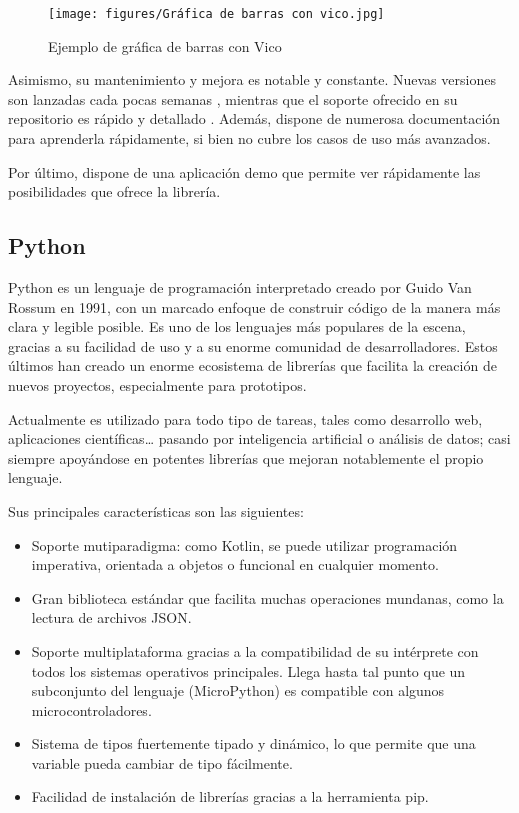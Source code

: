             \begin{figure}[h]
                \centering
                \texttt{[image: figures/Gráfica de barras con vico.jpg]}
                \caption{Ejemplo de gráfica de barras con Vico}
                \label{figure:vico:ejemplo_barras}
            \end{figure}
            
            Asimismo, su mantenimiento y mejora es notable y constante. Nuevas versiones son lanzadas
            cada pocas semanas \cite{goworowski_vico_2023-1}, mientras que el soporte ofrecido en su repositorio 
            es rápido y detallado \cite{goworowski_vico_2023}. Además, dispone de numerosa documentación para
            aprenderla rápidamente, si bien no cubre los casos de uso más avanzados.

            Por último, dispone de una aplicación demo que permite ver rápidamente las posibilidades que ofrece la 
            librería.
    
        \subsection{Python}
            Python es un lenguaje de programación interpretado creado por Guido Van Rossum en 1991, con un marcado enfoque 
            de construir código de la manera más clara y legible posible. Es uno de los lenguajes más populares de la 
            escena, gracias a su facilidad de uso y a su enorme comunidad de desarrolladores. Estos últimos han creado un 
            enorme ecosistema de librerías que facilita la creación de nuevos proyectos, especialmente para prototipos.

            Actualmente es utilizado para todo tipo de tareas, tales como desarrollo web, aplicaciones científicas… 
            pasando por inteligencia artificial o análisis de datos; casi siempre apoyándose en potentes librerías 
            que mejoran notablemente el propio lenguaje. 

            Sus principales características son las siguientes:
            \begin{itemize}
                \item Soporte mutiparadigma: como Kotlin, se puede utilizar programación imperativa, orientada a objetos o 
                funcional en cualquier momento.
                \item Gran biblioteca estándar que facilita muchas operaciones mundanas, como la lectura de archivos JSON.
                \item Soporte multiplataforma gracias a la compatibilidad de su intérprete con todos los sistemas 
                operativos principales. Llega hasta tal punto que un subconjunto del lenguaje (MicroPython) es compatible 
                con algunos microcontroladores.
                \item Sistema de tipos fuertemente tipado y dinámico, lo que permite que una variable pueda cambiar de 
                tipo fácilmente.
                \item Facilidad de instalación de librerías gracias a la herramienta pip.
            \end{itemize}
        

